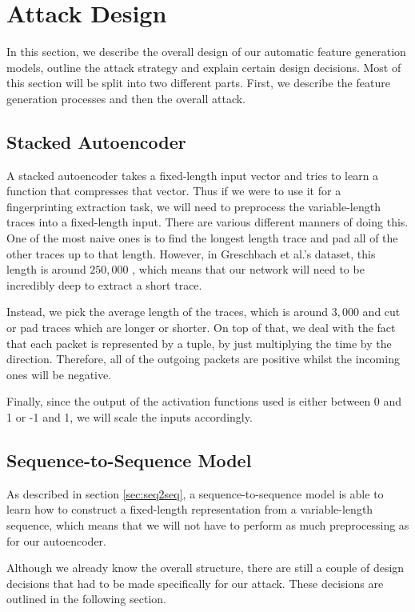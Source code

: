 \chapter{Attack Design}

In this section, we describe the overall design of our automatic feature generation models, outline the attack strategy and explain certain design decisions.
Most of this section will be split into two different parts.
First, we describe the feature generation processes and then the overall attack.

\section{Stacked Autoencoder}

A stacked autoencoder takes a fixed-length input vector and tries to learn a function that compresses that vector.
Thus if we were to use it for a fingerprinting extraction task, we will need to preprocess the variable-length traces into a fixed-length input.
There are various different manners of doing this.
One of the most naive ones is to find the longest length trace and pad all of the other traces up to that length.
However, in Greschbach et al.'s dataset, this length is around $250,000$ \cite{greschbach2016effect}, which means that our network will need to be incredibly deep to extract a short trace.

Instead, we pick the average length of the traces, which is around $3,000$ and cut or pad traces which are longer or shorter.
On top of that, we deal with the fact that each packet is represented by a tuple, by just multiplying the time by the direction.
Therefore, all of the outgoing packets are positive whilst the incoming ones will be negative.

Finally, since the output of the activation functions used is either between 0 and 1 or -1 and 1, we will scale the inputs accordingly.

\section{Sequence-to-Sequence Model}

As described in section \ref{sec:seq2seq}, a sequence-to-sequence model is able to learn how to construct a fixed-length representation from a variable-length sequence, which means that we will not have to perform as much preprocessing as for our autoencoder.

Although we already know the overall structure, there are still a couple of design decisions that had to be made specifically for our attack.
These decisions are outlined in the following section.


